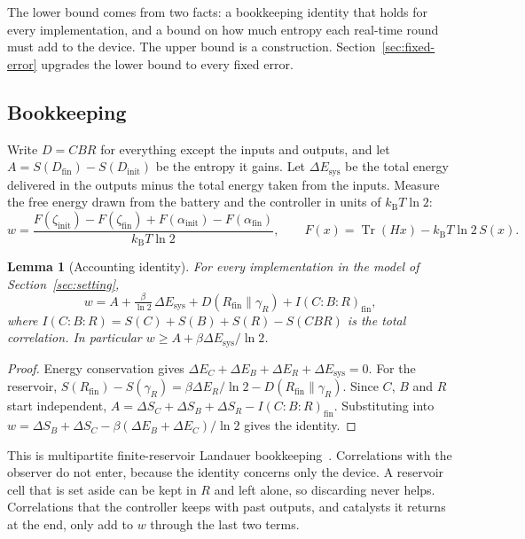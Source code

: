 \documentclass[11pt]{article}
\newtheorem{lemma}[theorem]{Lemma}
\theoremstyle{definition}
\theoremstyle{remark}
\newcommand{\Tr}{\operatorname{Tr}}
\newcommand{\kB}{k_{\mathrm B}}
\begin{document}
The lower bound comes from two facts: a bookkeeping identity that holds for every implementation, and a bound on how much entropy each real-time round must add to the device. The upper bound is a construction. Section~\ref{sec:fixed-error} upgrades the lower bound to every fixed error.

\subsection{Bookkeeping}

Write $D=CBR$ for everything except the inputs and outputs, and let $A=S(D_{\mathrm{fin}})-S(D_{\mathrm{init}})$ be the entropy it gains. Let $\Delta E_{\mathrm{sys}}$ be the total energy delivered in the outputs minus the total energy taken from the inputs. Measure the free energy drawn from the battery and the controller in units of $\kB T\ln2$:
\[
w=\frac{F(\zeta_{\mathrm{init}})-F(\zeta_{\mathrm{fin}})+F(\alpha_{\mathrm{init}})-F(\alpha_{\mathrm{fin}})}{\kB T\ln 2},\qquad F(x)=\Tr(H x)-\kB T\ln2\,S(x).
\]

\begin{lemma}[Accounting identity]\label{lem:accounting}
For every implementation in the model of Section~\ref{sec:setting},
\[
w=A+\tfrac{\beta}{\ln2}\,\Delta E_{\mathrm{sys}}+D(R_{\mathrm{fin}}\|\gamma_R)+I(C{:}B{:}R)_{\mathrm{fin}},
\]
where $I(C{:}B{:}R)=S(C)+S(B)+S(R)-S(CBR)$ is the total correlation. In particular $w\ge A+\beta\Delta E_{\mathrm{sys}}/\ln2$.
\end{lemma}

\begin{proof}
Energy conservation gives $\Delta E_C+\Delta E_B+\Delta E_R+\Delta E_{\mathrm{sys}}=0$. For the reservoir, $S(R_{\mathrm{fin}})-S(\gamma_R)=\beta\Delta E_R/\ln2-D(R_{\mathrm{fin}}\|\gamma_R)$. Since $C$, $B$ and $R$ start independent, $A=\Delta S_C+\Delta S_B+\Delta S_R-I(C{:}B{:}R)_{\mathrm{fin}}$. Substituting into $w=\Delta S_B+\Delta S_C-\beta(\Delta E_B+\Delta E_C)/\ln2$ gives the identity.
\end{proof}

This is multipartite finite-reservoir Landauer bookkeeping~\cite{ReebWolf14}. Correlations with the observer do not enter, because the identity concerns only the device. A reservoir cell that is set aside can be kept in $R$ and left alone, so discarding never helps. Correlations that the controller keeps with past outputs, and catalysts it returns at the end, only add to $w$ through the last two terms.
\end{document}

